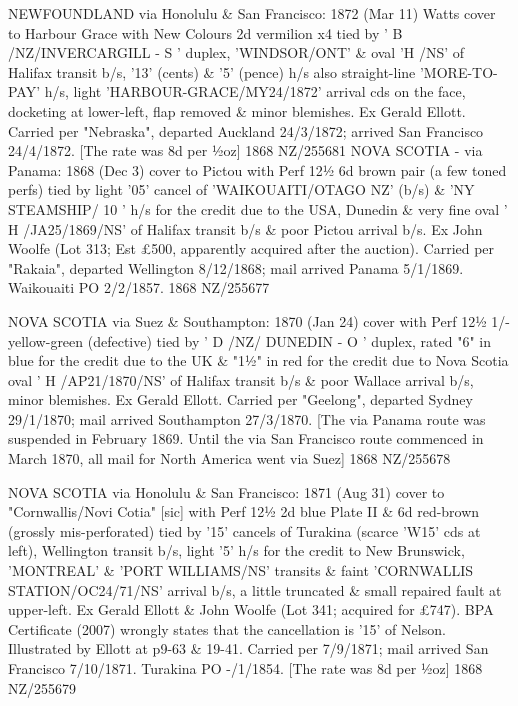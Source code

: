 \documentclass[justified]{tufte-book}
\begin{document}
%
{ NEWFOUNDLAND via Honolulu \& San Francisco: 1872 (Mar 11) Watts cover to Harbour Grace with New Colours 2d vermilion x4 tied by ' B /NZ/INVERCARGILL - S ' duplex, 'WINDSOR/ONT' \& oval 'H /NS' of Halifax transit b/s, '13' (cents) \& '5' (pence) h/s also straight-line 'MORE-TO-PAY' h/s, light 'HARBOUR-GRACE/MY24/1872' arrival cds on the face, docketing at lower-left, flap removed \& minor blemishes. Ex Gerald Ellott. Carried per "Nebraska", departed Auckland 24/3/1872; arrived San Francisco 24/4/1872. [The rate was 8d per ½oz]}%
{1868}%
{NZ/255681}%
{}%
{}
{}%
{}
%
{ NOVA SCOTIA - via Panama: 1868 (Dec 3) cover to Pictou with Perf 12½ 6d brown pair (a few toned perfs) tied by light '05' cancel of 'WAIKOUAITI/OTAGO NZ' (b/s) \& 'NY STEAMSHIP/ 10 ' h/s for the credit due to the USA, Dunedin \& very fine oval ' H /JA25/1869/NS' of Halifax transit b/s \& poor Pictou arrival b/s. Ex John Woolfe (Lot 313; Est £500, apparently acquired after the auction). Carried per "Rakaia", departed Wellington 8/12/1868; mail arrived Panama 5/1/1869. Waikouaiti PO 2/2/1857.}%
{1868}%
{NZ/255677}%
{}%
{}
{}%
{}

%
{NOVA SCOTIA via Suez \& Southampton: 1870 (Jan 24) cover with Perf 12½ 1/- yellow-green (defective) tied by ' D /NZ/ DUNEDIN - O ' duplex, rated "6" in blue for the credit due to the UK \& "1½" in red for the credit due to Nova Scotia oval ' H /AP21/1870/NS' of Halifax transit b/s \& poor Wallace arrival b/s, minor blemishes. Ex Gerald Ellott. Carried per "Geelong", departed Sydney 29/1/1870; mail arrived Southampton 27/3/1870. [The via Panama route was suspended in February 1869. Until the via San Francisco route commenced in March 1870, all mail for North America went via Suez]}%
{1868}%
{NZ/255678}%
{}%
{}
{}%
{}

%
{ NOVA SCOTIA via Honolulu \& San Francisco: 1871 (Aug 31) cover to "Cornwallis/Novi Cotia" [sic] with Perf 12½ 2d blue Plate II \& 6d red-brown (grossly mis-perforated) tied by '15' cancels of Turakina (scarce 'W15' cds at left), Wellington transit b/s, light '5' h/s for the credit to New Brunswick, 'MONTREAL' \& 'PORT WILLIAMS/NS' transits \& faint 'CORNWALLIS STATION/OC24/71/NS' arrival b/s, a little truncated \& small repaired fault at upper-left. Ex Gerald Ellott \& John Woolfe (Lot 341; acquired for £747). BPA Certificate (2007) wrongly states that the cancellation is '15' of Nelson. Illustrated by Ellott at p9-63 \& 19-41. Carried per  7/9/1871; mail arrived San Francisco 7/10/1871. Turakina PO -/1/1854. [The rate was 8d per ½oz]}%
{1868}%
{NZ/255679}%
{}%
{}
{}%
{}
\end{document}
